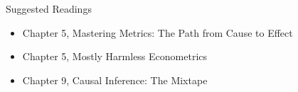 \documentclass[dvipsnames,hyperref={pdfpagelabels=false}]{beamer}
\begin{document}








\begin{frame}{Suggested Readings}
	\begin{itemize} 
		\item Chapter 5, Mastering Metrics: The Path from Cause to Effect
		\vspace{0.2cm}
		\item Chapter 5, Mostly Harmless Econometrics
		\vspace{0.2cm}
		\item Chapter 9, Causal Inference: The Mixtape
	\end{itemize}
\end{frame}
\end{document}
